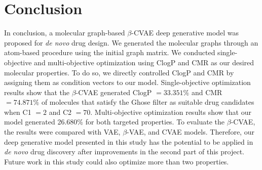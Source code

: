 \chapter{Conclusion}
In conclusion, a molecular graph-based $\beta$-CVAE deep generative model was proposed for \textit{de novo} drug design. We generated the molecular graphs through an atom-based procedure using the initial graph matrix. We conducted single-objective and multi-objective optimization using ClogP and CMR as our desired molecular properties. To do so, we directly controlled ClogP and CMR by assigning them as condition vectors to our model. Single-objective optimization results show that the $\beta$-CVAE generated ClogP $= 33.351\%$ and CMR $=74.871\%$ of molecules that satisfy the Ghose filter as suitable drug candidates when C1 $= 2$ and C2 $= 70$. Multi-objective optimization results show that our model generated 26.680\% for both targeted properties. To evaluate the $\beta$-CVAE, the results were compared with VAE, $\beta$-VAE, and CVAE models. Therefore, our deep generative model presented in this study has the potential to be applied in \textit{de novo} drug discovery after improvements in the second part of this project. Future work in this study could also optimize more than two properties. 